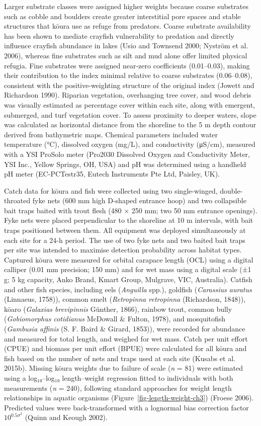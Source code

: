 \documentclass[
  12pt,
  a4paper,
  oneside]{scrbook}
\begin{document}
Larger substrate classes were assigned higher weights because coarse
substrates such as cobble and boulders create greater interstitial pore
spaces and stable structures that kōura use as refuge from predators.
Coarse substrate availability has been shown to mediate crayfish
vulnerability to predation and directly influence crayfish abundance in
lakes (Usio and Townsend 2000; Nyström et al. 2006), whereas fine
substrates such as silt and mud alone offer limited physical refugia.
Fine substrates were assigned near-zero coefficients (0.01--0.03),
making their contribution to the index minimal relative to coarse
substrates (0.06--0.08), consistent with the positive-weighting
structure of the original index (Jowett and Richardson 1990). Riparian
vegetation, overhanging tree cover, and wood debris was visually
estimated as percentage cover within each site, along with emergent,
submerged, and turf vegetation cover. To assess proximity to deeper
waters, slope was calculated as horizontal distance from the shoreline
to the 5 m depth contour derived from bathymetric maps. Chemical
parameters included water temperature (°C), dissolved oxygen (mg/L), and
conductivity (μS/cm), measured with a YSI ProSolo meter (Pro2030
Dissolved Oxygen and Conductivity Meter, YSI Inc., Yellow Springs, OH,
USA) and pH was determined using a handheld pH meter (EC-PCTestr35,
Eutech Instruments Pte Ltd, Paisley, UK).

Catch data for kōura and fish were collected using two single-winged,
double-throated fyke nets (600 mm high D-shaped entrance hoop) and two
collapsible bait traps baited with trout flesh (480 × 250 mm; two 50 mm
entrance openings). Fyke nets were placed perpendicular to the shoreline
at 10 m intervals, with bait traps positioned between them. All
equipment was deployed simultaneously at each site for a 24-h period.
The use of two fyke nets and two baited bait traps per site was intended
to maximise detection probability across habitat types. Captured kōura
were measured for orbital carapace length (OCL) using a digital calliper
(0.01 mm precision; 150 mm) and for wet mass using a digital scale (±1
g; 5 kg capacity, Anko Brand, Kmart Group, Mulgrave, VIC, Australia).
Catfish and other fish species, including eels (\emph{Anguilla} spp.),
goldfish (\emph{Carassius auratus} (Linnaeus, 1758)), common smelt
(\emph{Retropinna retropinna} (Richardson, 1848)), kōaro (\emph{Galaxias
brevipinnis} Günther, 1866), rainbow trout, common bully
(\emph{Gobiomorphus cotidianus} McDowall \& Fulton, 1978), and
mosquitofish (\emph{Gambusia affinis} (S. F. Baird \& Girard, 1853)),
were recorded for abundance and measured for total length, and weighed
for wet mass. Catch per unit effort (CPUE) and biomass per unit effort
(BPUE) were calculated for all kōura and fish based on the number of
nets and traps used at each site (Kusabs et al. 2015b). Missing kōura
weights due to failure of scale (\emph{n} = 81) were estimated using a
log₁₀--log₁₀ length--weight regression fitted to individuals with both
measurements (\emph{n} = 240), following standard approaches for weight
length relationships in aquatic organisms
({Figure~\ref{fig-length-weight-ch3}}) (Froese 2006). Predicted values
were back-transformed with a lognormal bias correction factor
\(10^{0.5 \sigma^2}\) (Quinn and Keough 2002).
\end{document}

